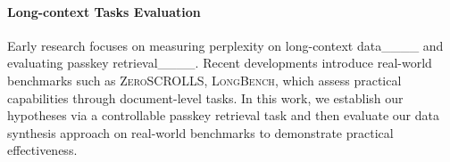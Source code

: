 \noindent\paragraph{Long-context Tasks Evaluation}
Early research focuses on measuring perplexity on long-context data____ and evaluating passkey retrieval____.
Recent developments introduce real-world benchmarks such as \textsc{ZeroSCROLLS}, \textsc{LongBench}, which assess practical capabilities through document-level tasks.
In this work, we establish our hypotheses via a controllable passkey retrieval task and then evaluate our data synthesis approach on real-world benchmarks to demonstrate practical effectiveness.